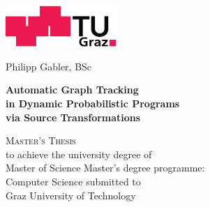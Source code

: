

\begin{titlingpage}



\begin{center}
\includegraphics[width=42mm]{figures/TU_Graz_Logo.pdf}
\vfill\vfill\vfill
\vfill\vfill\vfill

\sffamily

Philipp Gabler, BSc

\vfill

\begin{Spacing}{1.1}
\LARGE\bfseries Automatic Graph Tracking \\ in Dynamic Probabilistic Programs \\ via Source
Transformations
\end{Spacing}


\vfill\vfill\vfill\vfill

\textsc{Master's Thesis}\\
\vfill
to achieve the university degree of\\
{Master of Science}
\vfill
Master's degree programme:\\
Computer Science
\vfill\vfill\vfill
submitted to\\
Graz University of Technology


\end{center}
\end{titlingpage}
